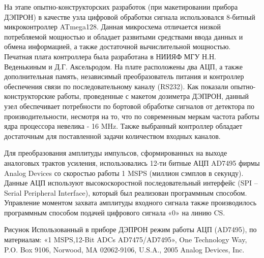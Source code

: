 \documentclass[a4paper,portrait,12pt]{article}
\begin{document}
{{{{На этапе опытно-конструкторских разработок (при макетировании прибора ДЭПРОН) в качестве узла цифровой обработки сигнала использовался 8-битный микроконтроллер ATmega128. Данная микросхема отличается низкой потребляемой мощностью и обладает развитыми средствами ввода данных и обмена информацией, а также достаточной вычислительной мощностью. Печатная плата контроллера была разработана в  НИИЯФ МГУ Н.Н. Веденькиным и Д.Г. Аксельродом. На плате расположены два АЦП, а также дополнительная память, независимый преобразователь питания и контроллер обеспечения связи по последовательному каналу (RS232). Как показали опытно-конструкторские работы, проведенные с макетом дозиметра ДЭПРОН, данный узел обеспечивает потребности по бортовой обработке сигналов от детектора по производительности, несмотря на то, что по современным меркам частота работы ядра процессора невелика - 16 MHz. Также выбранный контроллер обладает достаточным для поставленной задачи количеством входных каналов.


Для преобразования амплитуды импульсов, сформированных на выходе аналоговых трактов усиления, использовались 12-ти битные АЦП AD7495 фирмы Analog Devices со скоростью работы 1 MSPS (миллион сэмплов в секунду). Данные АЦП используют высокоскоростной последовательный интерфейс (SPI -- Serial Peripheral Interface), который был реализован программным способом. Управление моментом захвата амплитуды входного сигнала также производилось программным способом подачей цифрового сигнала «0» на линию CS. 





Рисунок Использованный в приборе ДЭПРОН режим работы АЦП (AD7495), по материалам:  «1 MSPS,12-Bit ADCs  AD7475/AD7495», One Technology Way, P.O. Box 9106, Norwood, MA 02062-9106, U.S.A., 2005 Analog Devices, Inc.


}}}}
\end{document}

